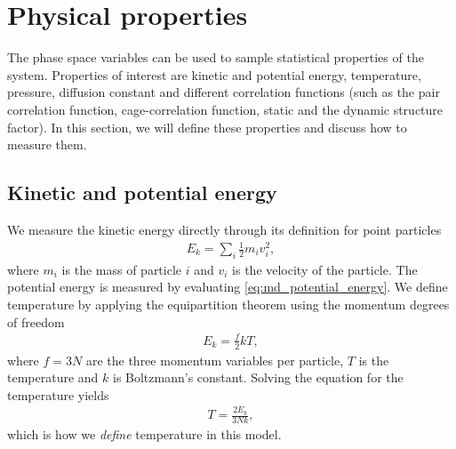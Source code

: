 \section{Physical properties}
The phase space variables can be used to sample statistical properties of the system. Properties of interest are kinetic and potential energy, temperature, pressure, diffusion constant and different correlation functions (such as the pair correlation function, cage-correlation function, static and the dynamic structure factor). In this section, we will define these properties and discuss how to measure them.
\subsection{Kinetic and potential energy}
We measure the kinetic energy directly through its definition for point particles
\begin{align}
	E_k = \sum_i \frac{1}{2} m_iv_i^2,
\end{align}
where $m_i$ is the mass of particle $i$ and $v_i$ is the velocity of the particle. The potential energy is measured by evaluating \eqref{eq:md_potential_energy}. We define temperature by applying the equipartition theorem using the momentum degrees of freedom
\begin{align*}
	E_k = \frac{f}{2}kT,
\end{align*}
where $f=3N$ are the three momentum variables per particle, $T$ is the temperature and $k$ is Boltzmann's constant. Solving the equation for the temperature yields
\begin{align}
	T = \frac{2E_k}{3Nk},
\end{align}
which is how we \textit{define} temperature in this model. 
